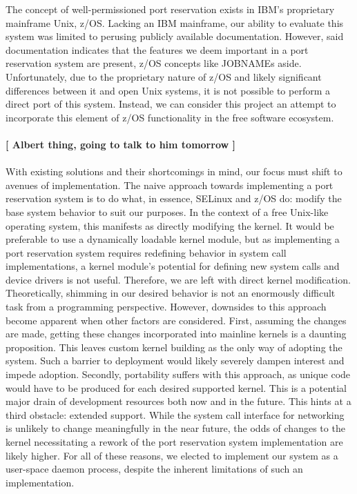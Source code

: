 \documentclass{sig-alternate}
\begin{document}
	The concept of well-permissioned port reservation exists in IBM's proprietary mainframe Unix, z/OS. Lacking an IBM mainframe, our ability to evaluate this system was limited to perusing publicly available documentation. However, said documentation indicates that the features we deem important in a port reservation system are present, z/OS concepts like JOBNAMEs aside. Unfortunately, due to the proprietary nature of z/OS and likely significant differences between it and open Unix systems, it is not possible to perform a direct port of this system. Instead, we can consider this project an attempt to incorporate this element of z/OS functionality in the free software ecosystem.
\\\\
\textbf{[ Albert thing, going to talk to him tomorrow ]}
\\\\
	With existing solutions and their shortcomings in mind, our focus must shift to avenues of implementation. The naive approach towards implementing a port reservation system is to do what, in essence, SELinux and z/OS do: modify the base system behavior to suit our purposes. In the context of a free Unix-like operating system, this manifests as directly modifying the kernel. It would be preferable to use a dynamically loadable kernel module, but as implementing a port reservation system requires redefining behavior in system call implementations, a kernel module's potential for defining new system calls and device drivers is not useful. Therefore, we are left with direct kernel modification. Theoretically, shimming in our desired behavior is not an enormously difficult task from a programming perspective. However, downsides to this approach become apparent when other factors are considered. First, assuming the changes are made, getting these changes incorporated into mainline kernels is a daunting proposition. This leaves custom kernel building as the only way of adopting the system. Such a barrier to deployment would likely severely dampen interest and impede adoption. Secondly, portability suffers with this approach, as unique code would have to be produced for each desired supported kernel. This is a potential major drain of development resources both now and in the future. This hints at a third obstacle: extended support. While the system call interface for networking is unlikely to change meaningfully in the near future, the odds of changes to the kernel necessitating a rework of the port reservation system implementation are likely higher. For all of these reasons, we elected to implement our system as a user-space daemon process, despite the inherent limitations of such an implementation.
\end{document}
